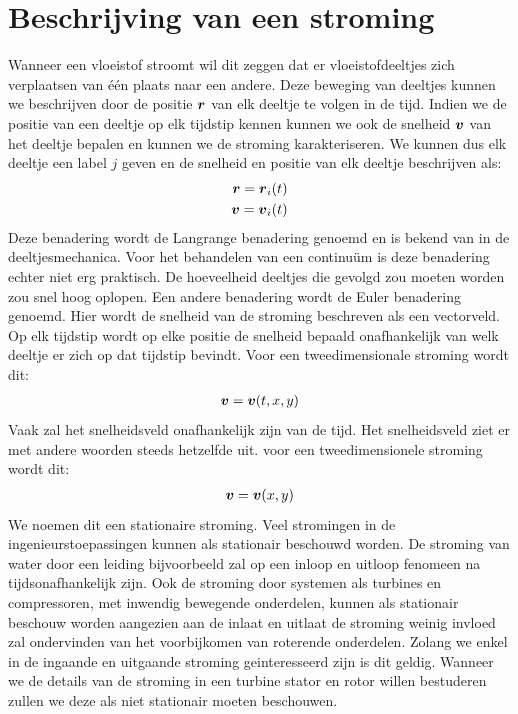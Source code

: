 	\section{Beschrijving van een stroming}
	\label{sec:Beschrijving van een stroming}
Wanneer een vloeistof stroomt wil dit zeggen dat er vloeistofdeeltjes zich verplaatsen van \'e\'en plaats naar een andere. Deze beweging van deeltjes kunnen we beschrijven door de positie $\boldsymbol{r}$ van elk deeltje te volgen in de tijd. Indien we de positie van een deeltje op elk tijdstip kennen kunnen we ook de snelheid $\boldsymbol{v}$ van het deeltje bepalen en kunnen we de stroming karakteriseren. We kunnen dus elk deeltje een label $j$ geven en de snelheid en positie van elk deeltje beschrijven als:
\begin{eqnarray}
	\boldsymbol{r} = \boldsymbol{r}_i(t) \\
	\boldsymbol{v} = \boldsymbol{v}_i(t)
\end{eqnarray}
Deze benadering wordt de Langrange benadering genoemd en is bekend van in de deeltjesmechanica. Voor het behandelen van een continu\"um is deze benadering echter niet erg praktisch. De hoeveelheid deeltjes die gevolgd zou moeten worden zou snel hoog oplopen.
\npar
Een andere benadering wordt de Euler benadering genoemd. Hier wordt de snelheid van de stroming beschreven als een vectorveld. Op elk tijdstip wordt op elke positie de snelheid bepaald onafhankelijk van welk deeltje er zich op dat tijdstip bevindt. Voor een tweedimensionale stroming wordt dit:
\begin{eqnarray}
	\boldsymbol{v} = \boldsymbol{v}(t,x,y)
\end{eqnarray}
Vaak zal het snelheidsveld onafhankelijk zijn van de tijd. Het snelheidsveld ziet er met andere woorden steeds hetzelfde uit. voor een tweedimensionele stroming wordt dit: 
\begin{eqnarray}
	\boldsymbol{v} = \boldsymbol{v}(x,y)
\end{eqnarray}
We noemen dit een stationaire stroming. Veel stromingen in de ingenieurstoepassingen kunnen als stationair beschouwd worden. De stroming van water door een leiding bijvoorbeeld zal op een inloop en uitloop fenomeen na tijdsonafhankelijk zijn. Ook de stroming door systemen als turbines en compressoren, met inwendig bewegende onderdelen, kunnen als stationair beschouw worden aangezien aan de inlaat en uitlaat de stroming weinig invloed zal ondervinden van het voorbijkomen van roterende onderdelen. Zolang we enkel in de ingaande en uitgaande stroming geinteresseerd zijn is dit geldig. Wanneer we de details van de stroming in een turbine stator en rotor willen bestuderen zullen we deze als niet stationair moeten beschouwen.

